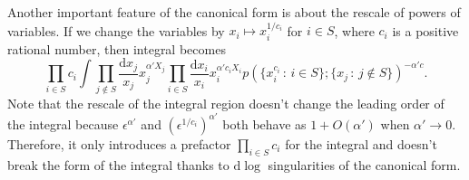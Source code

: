 \documentclass[12pt]{article}
\theoremstyle{definition}
\theoremstyle{plain}
\newcommand{\dif}{\mathrm{d}} %
\begin{document}

Another important feature of the canonical form is about the rescale of powers of variables.
If we change the variables by
\(
	x_i\mapsto x_i^{1/c_i}
\)
for $i\in S$, where $c_i$ is a positive rational number, then integral becomes
\[
	\prod_{i\in S}c_i\int
	\prod_{j\not\in S}\frac{\dif x_j}{x_j}x_j^{\alpha' X_j}
	\prod_{i\in S}\frac{\dif x_i}{x_i}x_i^{\alpha' c_iX_i}
	p(\{x_i^{c_i}\,:\, i\in S\};\{x_j\,:\, j\not\in S\})^{-\alpha' c}.
\]
Note that the rescale of the integral region doesn't change the leading order of the integral
because $\epsilon^{\alpha'}$ and $(\epsilon^{1/c_i})^{\alpha'}$ both behave as $1+O(\alpha')$
when $\alpha'\to 0$. Therefore, it only introduces a prefactor $\prod_{i\in S}c_i$ 
for the integral and doesn't break the form of the integral 
thanks to $\dif \log$ singularities of the canonical form.
\end{document}
